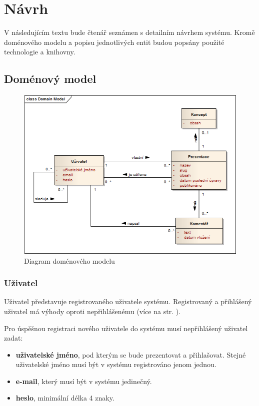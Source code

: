 \documentclass[11pt,twoside,a4paper]{book}
\begin{document}
\chapter{Návrh}

V následujícím textu bude čtenář seznámen s detailním návrhem systému. Kromě doménového modelu a popisu jednotlivých entit budou popsány použité technologie a knihovny.

\section{Doménový model}
\begin{figure}[ht]
	\begin{center}
		\includegraphics[width=14cm]{PRO-img/domain.png}
		\caption{Diagram doménového modelu}
		\label{fig:domainModel}
	\end{center}
\end{figure}

\subsection{Uživatel}
Uživatel představuje registrovaného uživatele systému. Registrovaný a přihlášený uživatel má výhody oproti nepřihlášenému (více na str. \pageref{chap:userstory}).

Pro úspěšnou registraci nového uživatele do systému musí nepřihlášený uživatel zadat:

\begin{itemize}
	\item \textbf{uživatelské jméno}, pod kterým se bude prezentovat a přihlašovat. Stejné uživatelské jméno musí být v systému registrováno jenom jednou.
	\item \textbf{e-mail}, který musí být v systému jedinečný.
	\item \textbf{heslo}, minimální délka 4 znaky.
\end{itemize}
\end{document}

